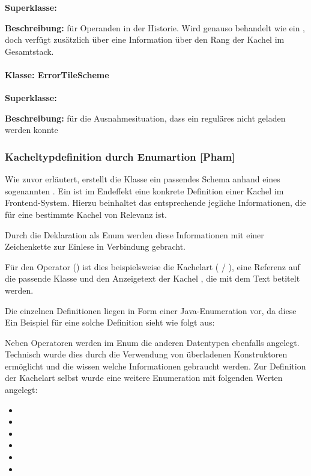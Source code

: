 \textbf{Superklasse:} 

\textbf{Beschreibung: } für Operanden in der Historie. Wird genauso behandelt wie ein , doch verfügt zusätzlich über eine Information über den Rang der Kachel im Gesamtstack.

\paragraph{Klasse: ErrorTileScheme}

\textbf{Superklasse:} 

\textbf{Beschreibung: } für die Ausnahmesituation, dass ein reguläres  nicht geladen werden konnte

\subsubsection{Kacheltypdefinition durch Enumartion [Pham]}

Wie zuvor erläutert, erstellt die Klasse  ein passendes Schema anhand eines sogenannten . Ein  ist im Endeffekt eine konkrete Definition einer Kachel im Frontend-System. Hierzu beinhaltet das entsprechende  jegliche Informationen, die für eine bestimmte Kachel von Relevanz ist. 

Durch die Deklaration als Enum werden diese Informationen mit einer Zeichenkette zur Einlese in Verbindung gebracht. 

Für den Operator \code{-} () ist dies beispielsweise die Kachelart ( / ), eine Referenz auf die passende  Klasse und den Anzeigetext der Kachel \code{-}, die mit dem Text  betitelt werden. 

Die einzelnen Definitionen liegen in Form einer Java-Enumeration vor, da diese Ein Beispiel für eine solche Definition sieht wie folgt aus:


Neben Operatoren werden im Enum die anderen Datentypen ebenfalls angelegt. Technisch wurde dies durch die Verwendung von überladenen Konstruktoren ermöglicht und die  wissen welche Informationen gebraucht werden. Zur Definition der Kachelart selbst wurde eine weitere Enumeration mit folgenden Werten angelegt:

\begin{itemize}
	\item {}
	\item {}
	\item {}
	\item {}
	\item {}
	\item {}
\end{itemize}

